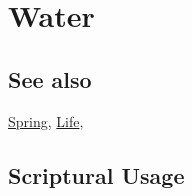 \section{Water}
	\label{WATER}
	
\subsection{See also}

	\hyperref[SPRING]{Spring}, \hyperref[LIFE]{Life},





\subsection{Scriptural Usage} %
	\label{WATER-SCRIPTURES}

	
	

